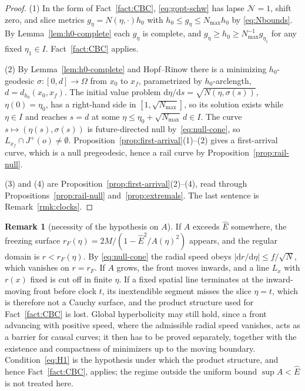 \documentclass[aip,jmp,amsmath,amssymb,reprint]{revtex4-2}
\newcommand{\Ehat}{\hat E}
\newcommand{\dd}{\mathrm{d}}
\theoremstyle{plain}
\theoremstyle{definition}
\newtheorem{remark}[proposition]{Remark}
\begin{document}
\begin{proof}
(1) In the form of Fact~\ref{fact:CBC}, \eqref{eq:gopt-schw} has lapse $\mathcal N=1$, shift
zero, and slice metrics $g_\eta=N(\eta,\cdot)h_0$ with $h_0\le g_\eta\le N_{\max}h_0$ by
\eqref{eq:Nbounds}. By Lemma~\ref{lem:h0-complete} each $g_\eta$ is complete, and
$g_\eta\ge h_0\ge N_{\max}^{-1}g_{\eta_1}$ for any fixed $\eta_1\in I$.
Fact~\ref{fact:CBC} applies.

(2) By Lemma~\ref{lem:h0-complete} and Hopf--Rinow there is a minimizing $h_0$-geodesic
$\sigma:[0,d]\to\Omega$ from $x_0$ to $x_f$, parametrized by $h_0$-arclength,
$d=d_{h_0}(x_0,x_f)$. The initial value problem $\dd\eta/\dd s=\sqrt{N(\eta,\sigma(s))}$,
$\eta(0)=\eta_0$, has a right-hand side in $[1,\sqrt{N_{\max}}]$, so its solution exists
while $\eta\in I$ and reaches $s=d$ at some $\eta\le\eta_0+\sqrt{N_{\max}}\,d\in I$. The curve
$s\mapsto(\eta(s),\sigma(s))$ is future-directed null by~\eqref{eq:null-cone}, so
$L_{x_f}\cap J^+(o)\neq\emptyset$. Proposition~\ref{prop:first-arrival}(1)--(2) gives a
first-arrival curve, which is a null pregeodesic, hence a rail curve by
Proposition~\ref{prop:rail-null}.

(3) and (4) are Proposition~\ref{prop:first-arrival}(2)--(4), read through
Propositions~\ref{prop:rail-null} and~\ref{prop:extremals}. The last sentence is
Remark~\ref{rmk:clocks}.
\end{proof}

\begin{remark}[necessity of the hypothesis on $A$]\label{rmk:freezing}
If $A$ exceeds $\Ehat$ somewhere, the freezing surface
$r_F(\eta)=2M/(1-\Ehat^2/A(\eta)^2)$ appears, and the regular domain is $r<r_F(\eta)$. By
\eqref{eq:null-cone} the radial speed obeys $|\dd r/\dd\eta|\le f/\sqrt N$, which vanishes
on $r=r_F$. If $A$ grows, the front moves inwards, and a line $L_x$ with $r(x)$ fixed is
cut off in finite $\eta$. If a fixed spatial line terminates at the inward-moving front before clock $t$, its
inextendible segment misses the slice $\eta=t$, which is therefore not a Cauchy surface, and the product structure
used for Fact~\ref{fact:CBC} is lost.
Global hyperbolicity may still hold, since a front advancing with positive speed, where the admissible radial
speed vanishes, acts as a barrier for causal curves; it then has to be proved separately, together with the
existence and compactness of minimizers up to the moving boundary. Condition~\eqref{eq:H1} is the hypothesis under
which the product structure, and hence Fact~\ref{fact:CBC}, applies; the regime outside the uniform bound $\sup A<\Ehat$ is not treated here.
\end{remark}
\end{document}
